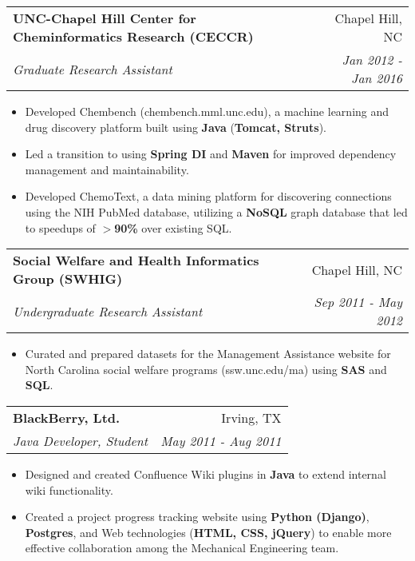 \documentclass[letterpaper,11pt]{article}
\makeatletter
\newcommand{\resumeItem}[2]{
  \item\small{
    \textbf{#1}{#2 \vspace{-2pt}}
  }
}
\newcommand{\resumeSubheading}[4]{
  \vspace{-1pt}\item
    \begin{tabular*}{0.97\textwidth}[t]{l@{\extracolsep{\fill}}r}
      \textbf{#1} & #2 \\
      \textit{\small#3} & \textit{\small #4} \\
    \end{tabular*}\vspace{-5pt}
}
\newcommand{\resumeItemListStart}{\begin{itemize}}
\newcommand{\resumeItemListEnd}{\end{itemize}\vspace{-5pt}}
\makeatother
\begin{document}

  
  
    \resumeSubheading
      {UNC-Chapel Hill Center for Cheminformatics Research (CECCR)}{Chapel Hill, NC}
      {Graduate Research Assistant}{Jan 2012 - Jan 2016}
      \resumeItemListStart
        \resumeItem{}
        {Developed Chembench (chembench.mml.unc.edu), a machine learning and drug discovery platform built using \textbf{Java} (\textbf{Tomcat, Struts}).}
        \resumeItem{}
        {Led a transition to using \textbf{Spring DI} and \textbf{Maven} for improved dependency management and maintainability.}
        \resumeItem{}
        {Developed ChemoText, a data mining platform for discovering connections using the NIH PubMed database, utilizing a \textbf{NoSQL} graph database that led to speedups of \textbf{$>$90\%} over existing SQL.}
      \resumeItemListEnd

    \resumeSubheading
      {Social Welfare and Health Informatics Group (SWHIG)}{Chapel Hill, NC}
      {Undergraduate Research Assistant}{Sep 2011 - May 2012}
      \resumeItemListStart
        \resumeItem{}
        {Curated and prepared datasets for the Management Assistance website for North Carolina social welfare programs (ssw.unc.edu/ma) using \textbf{SAS} and \textbf{SQL}.}
      \resumeItemListEnd
    
    \resumeSubheading
      {BlackBerry, Ltd.}{Irving, TX}
      {Java Developer, Student}{May 2011 - Aug 2011}
      \resumeItemListStart
        \resumeItem{}
        {Designed and created Confluence Wiki plugins in \textbf{Java} to extend internal wiki functionality.}  
        \resumeItem{}
        {Created a project progress tracking website using \textbf{Python (Django)}, \textbf{Postgres}, and Web technologies (\textbf{HTML, CSS, jQuery}) to enable more effective collaboration among the Mechanical Engineering team.}
      \resumeItemListEnd
    
\end{document}
